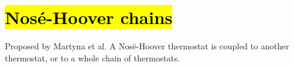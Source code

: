 \section[Nos\'e-Hoover chains]{\hl{Nos\'e-Hoover chains}}



Proposed by Martyna et al. 
A Nos\"e-Hoover thermostat is coupled to another thermostat, or to a whole chain of thermostats. 

